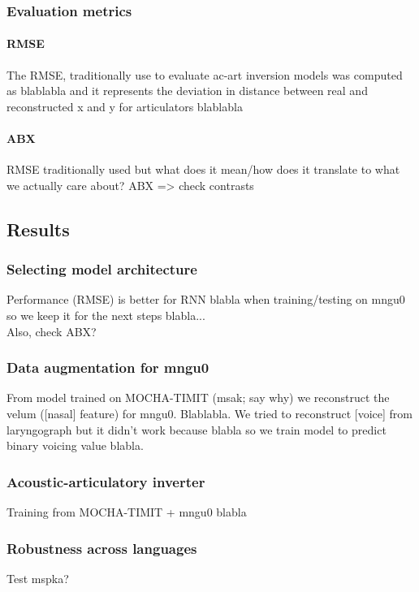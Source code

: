 \subsubsection{Evaluation metrics}
\paragraph{RMSE}
{\color{red}The RMSE, traditionally use to evaluate ac-art inversion models was computed as blablabla and it represents the deviation in distance between real and reconstructed x and y for articulators blablabla}
\paragraph{ABX}
{\color{red}RMSE traditionally used but what does it mean/how does it translate to what we actually care about? ABX => check contrasts}


\subsection{Results}
\subsubsection{Selecting model architecture}
{\color{red}Performance (RMSE) is better for RNN blabla when training/testing on mngu0 so we keep it for the next steps blabla... \\ Also, check ABX?}

\subsubsection{Data augmentation for mngu0}
{\color{red}From model trained on MOCHA-TIMIT (msak; say why) we reconstruct the velum ([nasal] feature) for mngu0. Blablabla. We tried to reconstruct [voice] from laryngograph but it didn't work because blabla so we train model to predict binary voicing value blabla.}

\subsubsection{Acoustic-articulatory inverter}
{\color{red}Training from MOCHA-TIMIT + mngu0 blabla}


\subsubsection{Robustness across languages}
{\color{red}Test mspka?}



